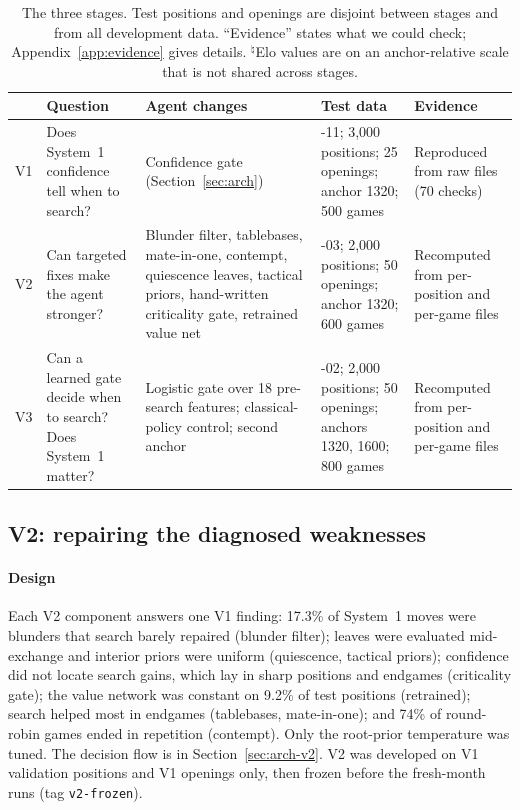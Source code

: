\begin{table}[t]
\centering
\caption{The three stages. Test positions and openings are disjoint between stages and from all development data. ``Evidence'' states what we could check; Appendix~\ref{app:evidence} gives details. $^{\natural}$Elo values are on an anchor-relative scale that is not shared across stages.}
\label{tab:stages}
\small
\begin{tabular}{@{}>{\raggedright\arraybackslash}p{0.8cm}>{\raggedright\arraybackslash}p{3.2cm}>{\raggedright\arraybackslash}p{5.2cm}>{\raggedright\arraybackslash}p{3.5cm}>{\raggedright\arraybackslash}p{3.2cm}@{}}
\toprule
 & Question & Agent changes & Test data & Evidence \\
\midrule
V1 & Does System~1 confidence tell when to search? & Confidence gate (Section~\ref{sec:arch}) & 2025-11; 3{,}000 positions; 25 openings; anchor 1320; 500 games & Reproduced from raw files (70 checks) \\
V2 & Can targeted fixes make the agent stronger? & Blunder filter, tablebases, mate-in-one, contempt, quiescence leaves, tactical priors, hand-written criticality gate, retrained value net & 2025-03; 2{,}000 positions; 50 openings; anchor 1320; 600 games & Recomputed from per-position and per-game files \\
V3 & Can a learned gate decide when to search? Does System~1 matter? & Logistic gate over 18 pre-search features; classical-policy control; second anchor & 2025-02; 2{,}000 positions; 50 openings; anchors 1320, 1600; 800 games & Recomputed from per-position and per-game files \\
\bottomrule
\end{tabular}
\end{table}

\subsection{V2: repairing the diagnosed weaknesses}
\paragraph*{Design}
Each V2 component answers one V1 finding: 17.3\% of System~1 moves were blunders that search barely repaired (blunder filter); leaves were evaluated mid-exchange and interior priors were uniform (quiescence, tactical priors); confidence did not locate search gains, which lay in sharp positions and endgames (criticality gate); the value network was constant on 9.2\% of test positions (retrained); search helped most in endgames (tablebases, mate-in-one); and 74\% of round-robin games ended in repetition (contempt). Only the root-prior temperature was tuned. The decision flow is in Section~\ref{sec:arch-v2}. V2 was developed on V1 validation positions and V1 openings only, then frozen before the fresh-month runs (tag \texttt{v2-frozen}).

